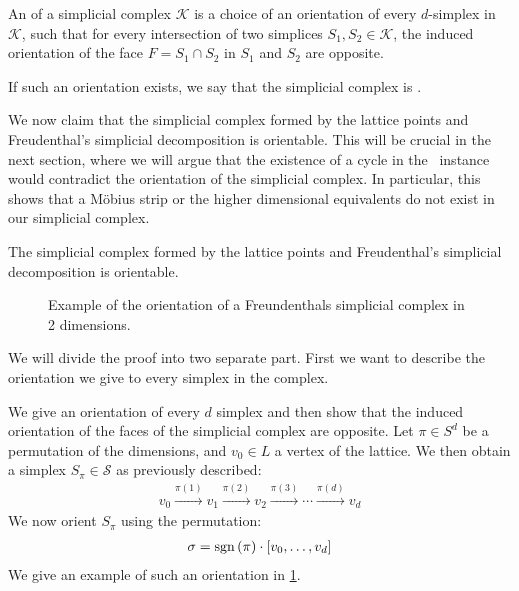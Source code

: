 \begin{definition}
	An  of a simplicial complex $\mathcal{K}$ is a choice of an orientation of every $d$-simplex in $\mathcal{K}$, such that for every intersection of two simplices $S_1, S_2 \in \mathcal{K}$, the induced orientation of the face $F = S_1 \cap S_2$ in $S_1$ and $S_2$ are opposite. \par
	If such an orientation exists, we say that the simplicial complex is .
\end{definition}

We now claim that the simplicial complex formed by the lattice points and Freudenthal's simplicial decomposition is orientable. This will be crucial in the next section, where we will argue that the existence of a cycle in the \EndOfLine\ instance would contradict the orientation of the simplicial complex. In particular, this shows that a Möbius strip or the higher dimensional equivalents do not exist in our simplicial complex.

\begin{proposition}
    \label{prop:orientability_freudenthal}
    The simplicial complex formed by the lattice points and Freudenthal's simplicial decomposition is orientable.
\end{proposition}

\begin{figure}[ht]
	\centering
	\caption[Orientation of a simplicial complex]{Example of the orientation of a Freundenthals simplicial complex in 2 dimensions.}
	\label{fig:orientation_of_simplicial_complex}
\end{figure}

We will divide the proof into two separate part. First we want to describe the orientation we give to every simplex in the complex.

We give an orientation of every $d$ simplex and then show that the induced orientation of the faces of the simplicial complex are opposite.
Let $\pi \in S^d$ be a permutation of the dimensions, and $v_0 \in L$ a vertex of the lattice. We then obtain a simplex $S_{\pi} \in \mathcal{S}$ as previously described:
\begin{align*}
    v_0 \xrightarrow{\pi(1)} v_1 \xrightarrow{\pi(2)} v_2 \xrightarrow{\pi(3)} \cdots \xrightarrow{\pi(d)} v_d
\end{align*}
We now orient $S_{\pi}$ using the permutation:
\begin{align*}
    \sigma = \operatorname{sgn}\left(\pi\right) \cdot [v_0, \dots, v_d]
\end{align*}
We give an example of such an orientation in \cref{fig:orientation_of_simplicial_complex}.


